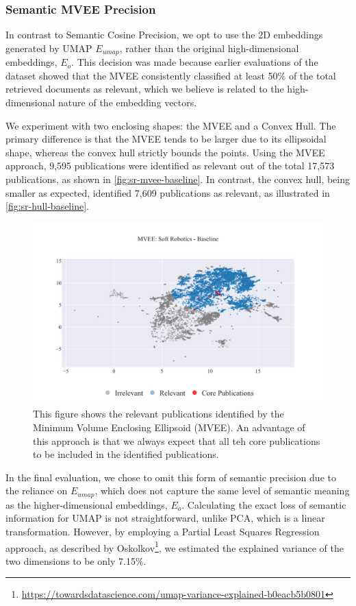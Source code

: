 \subsubsection{Semantic MVEE Precision}

In contrast to Semantic Cosine Precision, we opt to use the 2D embeddings generated by UMAP $E_{umap}$, rather than the original high-dimensional embeddings, $E_o$. This decision was made because earlier evaluations of the dataset showed that the MVEE consistently classified at least 50\% of the total retrieved documents as relevant, which we believe is related to the high-dimensional nature of the embedding vectors.

We experiment with two enclosing shapes: the MVEE and a Convex Hull. The primary difference is that the MVEE tends to be larger due to its ellipsoidal shape, whereas the convex hull strictly bounds the points. Using the MVEE approach, 9,595 publications were identified as relevant out of the total 17,573 publications, as shown in \autoref{fig:sr-mvee-baseline}. In contrast, the convex hull, being smaller as expected, identified 7,609 publications as relevant, as illustrated in \autoref{fig:sr-hull-baseline}.

\begin{figure}
	\centering	
	\includegraphics[scale=0.6]{pics/sr-mvee-baseline.pdf}
	\caption[Semantic MVEE Soft Robotics]{This figure shows the relevant publications identified by the Minimum Volume Enclosing Ellipsoid (MVEE). An advantage of this approach is that we always expect that all teh core publications to be included in the identified publications.}\label{fig:sr-mvee-baseline}
\end{figure}

In the final evaluation, we chose to omit this form of semantic precision due to the reliance on $E_{umap}$, which does not capture the same level of semantic meaning as the higher-dimensional embeddings, $E_o$. Calculating the exact loss of semantic information for UMAP is not straightforward, unlike PCA, which is a linear transformation. However, by employing a Partial Least Squares Regression approach, as described by Oskolkov\footnote{\url{https://towardsdatascience.com/umap-variance-explained-b0eacb5b0801}}, we estimated the explained variance of the two dimensions to be only 7.15\%.


